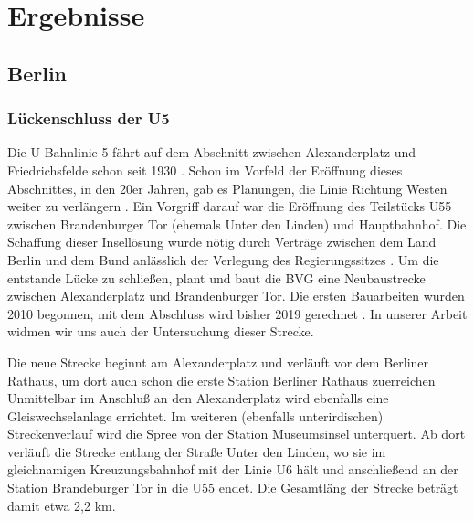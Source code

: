 \chapter{Ergebnisse}

\begin{comment}

Gliederung meiner Streckenbeschreibung (Yves)

* Übersicht
  * Umfeld des Bauprojekts
  * von wo nach wo
  * historische Einordnung

* konkrter Streckenverlauf
* detalierte Daten (weichen etc ..)


* Probleme
  * bautechnisch
  * gesellschaftlich

* Zeitplan

* Kosten
\end{comment}



\section{Berlin}
\subsection*{Lückenschluss der U5}

Die U-Bahnlinie 5 fährt auf dem Abschnitt zwischen Alexanderplatz und
Friedrichsfelde schon seit 1930 \cite{bkhU5}. Schon im Vorfeld der Eröffnung
dieses Abschnittes, in den 20er Jahren, gab es Planungen, die Linie Richtung
Westen weiter zu verlängern \cite{bvgWebsiteU5}. Ein Vorgriff darauf war die
Eröffnung des Teilstücks U55 zwischen Brandenburger Tor (ehemals Unter den
Linden) und Hauptbahnhof. Die Schaffung dieser Insellösung wurde nötig durch
Verträge zwischen dem Land Berlin und dem Bund anlässlich der Verlegung des
Regierungssitzes \cite{hauptstadtvertrag}. Um die entstande Lücke zu schließen,
plant und baut die BVG eine Neubaustrecke zwischen Alexanderplatz und
Brandenburger Tor. Die ersten Bauarbeiten wurden 2010 begonnen, mit dem
Abschluss wird bisher 2019 gerechnet \cite{bvgWebsiteU5plan}. In unserer Arbeit
widmen wir uns auch der Untersuchung dieser Strecke.

Die neue Strecke beginnt am Alexanderplatz und verläuft vor dem Berliner
Rathaus, um dort auch schon die erste Station Berliner Rathaus zuerreichen
\cite{bkhU5} \cite{bvgWebsiteU5} Unmittelbar im Anschluß an den Alexanderplatz
wird ebenfalls eine Gleiswechselanlage errichtet. Im weiteren (ebenfalls
unterirdischen) Streckenverlauf wird die Spree von der Station Museumsinsel
unterquert. Ab dort verläuft die Strecke entlang der Straße Unter den Linden, wo
sie im gleichnamigen Kreuzungsbahnhof mit der Linie U6 hält und anschließend an
der Station Brandeburger Tor in die U55 endet. Die Gesamtläng der Strecke
beträgt damit etwa 2,2 km.


